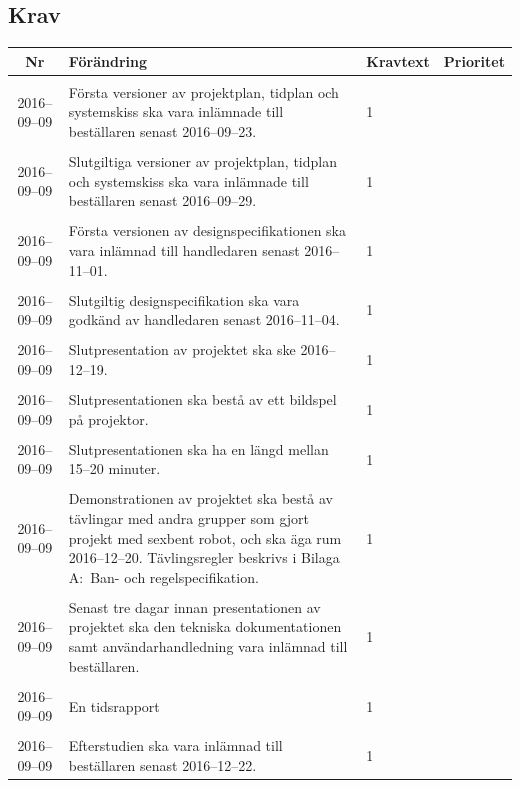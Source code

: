\documentclass[a4paper,titlepage,12pt]{article}
\newcounter{reqNr}
\newcounter{reqNrII}
\newcommand{\nextReqNrII}{\stepcounter{reqNrII}\arabic{reqNrII}}
\newcommand{\newRequirement}[1] {\pbox{5cm}{Tillagt \\#1}}
\begin{document}
	\subsection{Krav}
	\begin{longtable}[c]{ c l>{\raggedright}p{} l }
		\textbf{Nr} & \textbf{Förändring} & \textbf{Kravtext} & \textbf{Prioritet} 
			\\ \midrule

		\nextReqNrII{} & \newRequirement{2016--09--09} & Första versioner av
        projektplan, tidplan och systemskiss ska vara inlämnade till
        beställaren senast 2016--09--23. & 1
			\\ \midrule

		\nextReqNrII{} & \newRequirement{2016--09--09} & Slutgiltiga versioner av
        projektplan, tidplan och systemskiss ska vara inlämnade till
        beställaren senast 2016--09--29. & 1
			\\ \midrule

		\nextReqNrII{} & \newRequirement{2016--09--09} & Första versionen av
			designspecifikationen ska vara inlämnad till handledaren senast
			2016--11--01. & 1
			\\ \midrule

		\nextReqNrII{} & \newRequirement{2016--09--09} & Slutgiltig designspecifikation
			ska vara godkänd av handledaren senast 2016--11--04. & 1
			\\ \midrule
			
		\nextReqNrII{} & \newRequirement{2016--09--09} & Slutpresentation av projektet ska
		ske 2016--12--19. & 1
			\\ \midrule

		\nextReqNrII{} & \newRequirement{2016--09--09} & Slutpresentationen ska bestå av
		ett bildspel på projektor. & 1
			\\ \midrule

		\nextReqNrII{} & \newRequirement{2016--09--09} & Slutpresentationen ska ha en
		längd mellan 15--20 minuter. & 1
			\\ \midrule

		\nextReqNrII{} & \newRequirement{2016--09--09} & Demonstrationen av projektet ska
		bestå av tävlingar med andra grupper som gjort projekt med sexbent
		robot, och ska äga rum 2016--12--20. Tävlingsregler beskrivs i Bilaga
		A:\ Ban- och regelspecifikation. & 1
			\\ \midrule

		\nextReqNrII{} & \newRequirement{2016--09--09} & Senast tre dagar innan
			presentationen av projektet ska den tekniska dokumentationen
			samt användarhandledning vara inlämnad till beställaren. & 1
			\\ \midrule

		\nextReqNrII{} & \newRequirement{2016--09--09} & En tidsrapport & 1
			\\ \midrule

		\nextReqNrII{} & \newRequirement{2016--09--09} & Efterstudien ska vara inlämnad
		till beställaren senast 2016--12--22. & 1
			\\ 

	\end{longtable}
	
\end{document}
